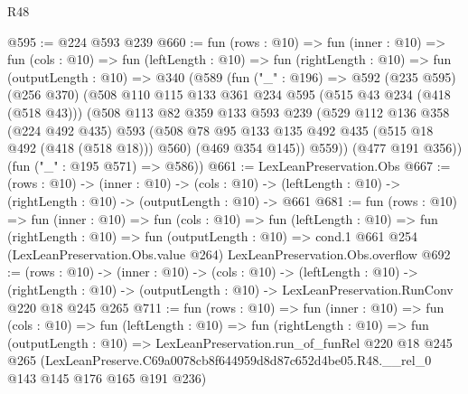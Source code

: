 \begin{lexlean}{R48}
\begin{coremodule}
@595 := @224 @593 @239
@660 := fun (rows : @10) =>
  fun (inner : @10) =>
  fun (cols : @10) =>
  fun (leftLength : @10) =>
  fun (rightLength : @10) =>
  fun (outputLength : @10) =>
  @340
    (@589
      (fun ("_" : @196) =>
      @592
        (@235 @595)
        (@256 @370)
        (@508
          @110
          @115
          @133
          @361
          @234
          @595
          (@515 @43 @234 (@418 (@518 @43)))
          (@508
            @113
            @82
            @359
            @133
            @593
            @239
            (@529
              @112
              @136
              @358
              (@224 @492 @435)
              @593
              (@508 @78 @95 @133 @135 @492 @435 (@515 @18 @492 (@418 (@518 @18))) @560)
              (@469 @354 @145))
            @559))
        (@477 @191 @356))
      (fun ("_" : @195 @571) => @586))
@661 := LexLeanPreservation.Obs
@667 := (rows : @10) ->
  (inner : @10) ->
  (cols : @10) -> (leftLength : @10) -> (rightLength : @10) -> (outputLength : @10) -> @661
@681 := fun (rows : @10) =>
  fun (inner : @10) =>
  fun (cols : @10) =>
  fun (leftLength : @10) =>
  fun (rightLength : @10) =>
  fun (outputLength : @10) =>
  cond.{1} @661 @254 (LexLeanPreservation.Obs.value @264) LexLeanPreservation.Obs.overflow
@692 := (rows : @10) ->
  (inner : @10) ->
  (cols : @10) ->
  (leftLength : @10) ->
  (rightLength : @10) -> (outputLength : @10) -> LexLeanPreservation.RunConv @220 @18 @245 @265
@711 := fun (rows : @10) =>
  fun (inner : @10) =>
  fun (cols : @10) =>
  fun (leftLength : @10) =>
  fun (rightLength : @10) =>
  fun (outputLength : @10) =>
  LexLeanPreservation.run_of_funRel
    @220
    @18
    @245
    @265
    (LexLeanPreserve.C69a0078cb8f644959d8d87c652d4be05.R48.__rel_0 @143 @145 @176 @165 @191 @236)
\end{coremodule}
\end{lexlean}

